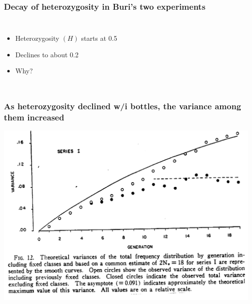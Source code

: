 
\begin{frame}
\frametitle{Decay of heterozygosity in Buri's two experiments}
\begin{columns}

\begin{itemize}
\item Heterozygosity $(H)$ starts at 0.5
\item Declines to about 0.2
\item Why?
\end{itemize}
\end{columns}
\end{frame}

\begin{frame}
\frametitle{As heterozygosity declined w/i bottles, the variance among
  them increased}
\includegraphics[width=\textwidth]{burivar1.pdf}
\end{frame}


